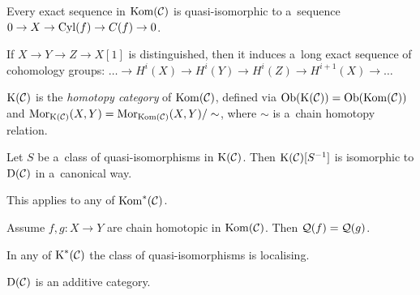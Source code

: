 	\begin{fact}
		Every exact sequence in $\operatorname{Kom}(\mathcal{C})$ is quasi-isomorphic 
		to a~sequence \\ $0 \to X \to \operatorname{Cyl}(f) \to C(f) \to 0$.
	\end{fact}
	
	\begin{fact}
		If $X \to Y \to Z \to X[1]$ is distinguished, then
		it induces a~long exact sequence of cohomology groups:
		$\ldots \to H^i(X) \to H^i(Y) \to H^i(Z) \to H^{i+1}(X) \to \ldots$
	\end{fact}
	
	\begin{definition}
		$\operatorname{K}(\mathcal{C})$ is the \emph{homotopy category} of $\operatorname{Kom}(\mathcal{C})$, defined via
		$\operatorname{Ob}(\operatorname{K}(\mathcal{C})) = \operatorname{Ob}(\operatorname{Kom}(\mathcal{C}))$ and $\operatorname{Mor}_{\operatorname{K}(\mathcal{C})}(X,Y)
		= \operatorname{Mor}_{\operatorname{Kom}(\mathcal{C})}(X,Y)/\sim$,
		where $\sim$ is a~chain homotopy relation.
	\end{definition}
	
	\begin{theorem}
		Let $S$ be a~class of quasi-isomorphisms in $\operatorname{K}(\mathcal{C})$. 
		Then $\operatorname{K}(\mathcal{C})[S^{-1}]$ is isomorphic to $\operatorname{D}(\mathcal{C})$ in a~canonical way.
		
		This applies to any of $\operatorname{Kom}^{\ast}(\mathcal{C})$.
	\end{theorem}
	
	\begin{lemma}
		Assume $f, g: X \to Y$ are chain homotopic in $\operatorname{Kom}(\mathcal{C})$.
		Then $\mathcal{Q}(f) = \mathcal{Q}(g)$.
	\end{lemma}
	
	\begin{theorem}
		In any of $\operatorname{K}^\ast(\mathcal{C})$ the class of quasi-isomorphisms is localising.
	\end{theorem}
	
	\begin{theorem}
		$\operatorname{D}(\mathcal{C})$ is an additive category.
	\end{theorem}

















 
 
